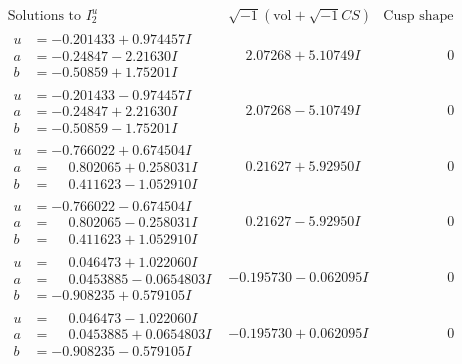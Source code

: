 \documentclass[1p]{elsarticle_modified}
\theoremstyle{definition}
\newcommand{\I}{\sqrt{-1}}
\begin{document}
$$\begin{array}{c|c|c}  
\text{Solutions to }I^u_{2}& \I (\text{vol} + \sqrt{-1}CS) & \text{Cusp shape}\\
 \hline 
\begin{aligned}
u &= -0.201433 + 0.974457 I \\
a &= -0.24847 - 2.21630 I \\
b &= -0.50859 + 1.75201 I\end{aligned}
 & \phantom{-}2.07268 + 5.10749 I & \phantom{-0.000000 } 0 \\ \hline\begin{aligned}
u &= -0.201433 - 0.974457 I \\
a &= -0.24847 + 2.21630 I \\
b &= -0.50859 - 1.75201 I\end{aligned}
 & \phantom{-}2.07268 - 5.10749 I & \phantom{-0.000000 } 0 \\ \hline\begin{aligned}
u &= -0.766022 + 0.674504 I \\
a &= \phantom{-}0.802065 + 0.258031 I \\
b &= \phantom{-}0.411623 - 1.052910 I\end{aligned}
 & \phantom{-}0.21627 + 5.92950 I & \phantom{-0.000000 } 0 \\ \hline\begin{aligned}
u &= -0.766022 - 0.674504 I \\
a &= \phantom{-}0.802065 - 0.258031 I \\
b &= \phantom{-}0.411623 + 1.052910 I\end{aligned}
 & \phantom{-}0.21627 - 5.92950 I & \phantom{-0.000000 } 0 \\ \hline\begin{aligned}
u &= \phantom{-}0.046473 + 1.022060 I \\
a &= \phantom{-}0.0453885 - 0.0654803 I \\
b &= -0.908235 + 0.579105 I\end{aligned}
 & -0.195730 - 0.062095 I & \phantom{-0.000000 } 0 \\ \hline\begin{aligned}
u &= \phantom{-}0.046473 - 1.022060 I \\
a &= \phantom{-}0.0453885 + 0.0654803 I \\
b &= -0.908235 - 0.579105 I\end{aligned}
 & -0.195730 + 0.062095 I & \phantom{-0.000000 } 0 \\ \hline\begin{aligned}

\end{aligned}
\end{array}$$
\end{document}
